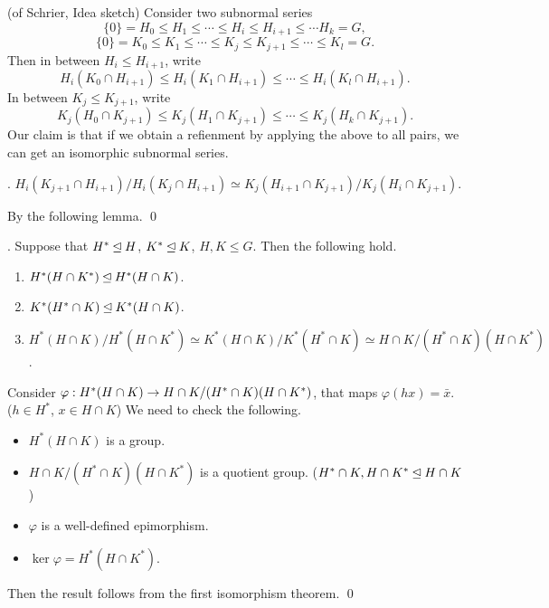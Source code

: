 \pf (of Schrier, Idea sketch) Consider two subnormal series
\[
    \{0\} = H_0 \leq H_1 \leq \cdots \leq H_i \leq H_{i+1} \leq \cdots H_k = G,
\]
\[
    \{0\} = K_0 \leq K_1 \leq \cdots \leq K_j \leq K_{j+1} \leq \cdots \leq K_l = G.
\]
Then in between \(H_i \leq H_{i+1}\), write
\[
    H_i(K_0 \cap H_{i+1}) \leq H_i(K_1 \cap H_{i+1}) \leq \cdots \leq H_i(K_l \cap H_{i+1}).
\]
In between \(K_j \leq K_{j+1}\), write
\[
    K_j (H_0 \cap K_{j+1}) \leq K_j (H_1 \cap K_{j+1}) \leq \cdots \leq K_j (H_k \cap K_{j+1}).
\]
Our claim is that if we obtain a refienment by applying the above to all pairs, we can get an isomorphic subnormal series.

\quad \claim. \(H_i (K_{j+1} \cap H_{i+1}) / H_i (K_j \cap H_{i+1}) \simeq K_j (H_{i+1} \cap K_{j+1}) / K_j (H_i \cap K_{j+1})\).

\quad \pf By the following lemma. \qed

\lemma.  Suppose that \(H^* \unlhd H\), \(K^* \unlhd K\), \(H, K \leq G\). Then the following hold.
\begin{enumerate}
    \item \(H^* (H \cap K^*) \unlhd H^*(H \cap K)\).
    \item \(K^* (H^* \cap K) \unlhd K^*(H \cap K)\).
    \item \(H^* (H\cap K) / H^*(H\cap K^*) \simeq K^*(H\cap K) / K^*(H^* \cap K) \simeq H\cap K / (H^* \cap K)(H\cap K^*)\).
\end{enumerate}

\pf Consider \(\varphi: H^*(H\cap K) \rightarrow H\cap K / (H^*\cap K)(H\cap K^*)\), that maps \(\varphi(hx) = \bar{x}\). (\(h \in H^*\), \(x \in H\cap K\)) We need to check the following.
\begin{itemize}
    \item \(H^* (H\cap K)\) is a group.
    \item \(H\cap K / (H^*\cap K)(H\cap K^*)\) is a quotient group. (\(H^* \cap K, H \cap K^* \unlhd H\cap K\))
    \item \(\varphi\) is a well-defined epimorphism.
    \item \(\ker\varphi = H^* (H \cap K^*)\).
\end{itemize}
Then the result follows from the first isomorphism theorem. \qed

\pagebreak
